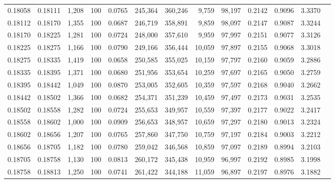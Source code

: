\begin{tabular}{rrrrrrrrrrrrr}
0.18058 & 0.18111 & 1,208 & 100 &                                     0.0765 & 245,364 & 360,246 &   9,759 &  98,197 & 0.2142 & 0.9096 & 3.3370 \\
0.18112 & 0.18170 & 1,355 & 100 &                                     0.0687 & 246,719 & 358,891 &   9,859 &  98,097 & 0.2147 & 0.9087 & 3.3244 \\
0.18170 & 0.18225 & 1,281 & 100 &                                     0.0724 & 248,000 & 357,610 &   9,959 &  97,997 & 0.2151 & 0.9077 & 3.3126 \\
0.18225 & 0.18275 & 1,166 & 100 &                                     0.0790 & 249,166 & 356,444 &  10,059 &  97,897 & 0.2155 & 0.9068 & 3.3018 \\
0.18275 & 0.18335 & 1,419 & 100 &                                     0.0658 & 250,585 & 355,025 &  10,159 &  97,797 & 0.2160 & 0.9059 & 3.2886 \\
0.18335 & 0.18395 & 1,371 & 100 &                                     0.0680 & 251,956 & 353,654 &  10,259 &  97,697 & 0.2165 & 0.9050 & 3.2759 \\
0.18395 & 0.18442 & 1,049 & 100 &                                     0.0870 & 253,005 & 352,605 &  10,359 &  97,597 & 0.2168 & 0.9040 & 3.2662 \\
0.18442 & 0.18502 & 1,366 & 100 &                                     0.0682 & 254,371 & 351,239 &  10,459 &  97,497 & 0.2173 & 0.9031 & 3.2535 \\
0.18502 & 0.18558 & 1,282 & 100 &                                     0.0724 & 255,653 & 349,957 &  10,559 &  97,397 & 0.2177 & 0.9022 & 3.2417 \\
0.18558 & 0.18602 & 1,000 & 100 &                                     0.0909 & 256,653 & 348,957 &  10,659 &  97,297 & 0.2180 & 0.9013 & 3.2324 \\
0.18602 & 0.18656 & 1,207 & 100 &                                     0.0765 & 257,860 & 347,750 &  10,759 &  97,197 & 0.2184 & 0.9003 & 3.2212 \\
0.18656 & 0.18705 & 1,182 & 100 &                                     0.0780 & 259,042 & 346,568 &  10,859 &  97,097 & 0.2189 & 0.8994 & 3.2103 \\
0.18705 & 0.18758 & 1,130 & 100 &                                     0.0813 & 260,172 & 345,438 &  10,959 &  96,997 & 0.2192 & 0.8985 & 3.1998 \\
0.18758 & 0.18813 & 1,250 & 100 &                                     0.0741 & 261,422 & 344,188 &  11,059 &  96,897 & 0.2197 & 0.8976 & 3.1882 \\

\end{tabular}
